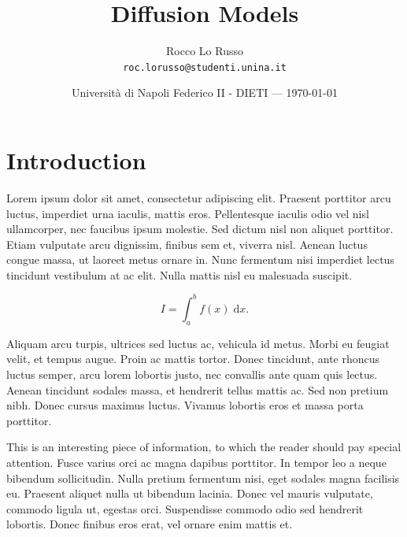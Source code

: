 \documentclass{article}
\title{Diffusion Models} %
\author{Rocco Lo Russo\\ \texttt{roc.lorusso@studenti.unina.it}} %
\date{Università di Napoli Federico II - DIETI --- \today} %
\begin{document}
\maketitle %


\section*{Introduction} %

Lorem ipsum dolor sit amet, consectetur adipiscing elit. Praesent porttitor arcu luctus, imperdiet urna iaculis, mattis eros. Pellentesque iaculis odio vel nisl ullamcorper, nec faucibus ipsum molestie. Sed dictum nisl non aliquet porttitor. Etiam vulputate arcu dignissim, finibus sem et, viverra nisl. Aenean luctus congue massa, ut laoreet metus ornare in. Nunc fermentum nisi imperdiet lectus tincidunt vestibulum at ac elit. Nulla mattis nisl eu malesuada suscipit.

\begin{equation}
	I = \int_{a}^{b} f(x) \; \text{d}x.
\end{equation}

Aliquam arcu turpis, ultrices sed luctus ac, vehicula id metus. Morbi eu feugiat velit, et tempus augue. Proin ac mattis tortor. Donec tincidunt, ante rhoncus luctus semper, arcu lorem lobortis justo, nec convallis ante quam quis lectus. Aenean tincidunt sodales massa, et hendrerit tellus mattis ac. Sed non pretium nibh. Donec cursus maximus luctus. Vivamus lobortis eros et massa porta porttitor.

\begin{info} %
	This is an interesting piece of information, to which the reader should pay special attention. Fusce varius orci ac magna dapibus porttitor. In tempor leo a neque bibendum sollicitudin. Nulla pretium fermentum nisi, eget sodales magna facilisis eu. Praesent aliquet nulla ut bibendum lacinia. Donec vel mauris vulputate, commodo ligula ut, egestas orci. Suspendisse commodo odio sed hendrerit lobortis. Donec finibus eros erat, vel ornare enim mattis et.
\end{info}

\end{document}
